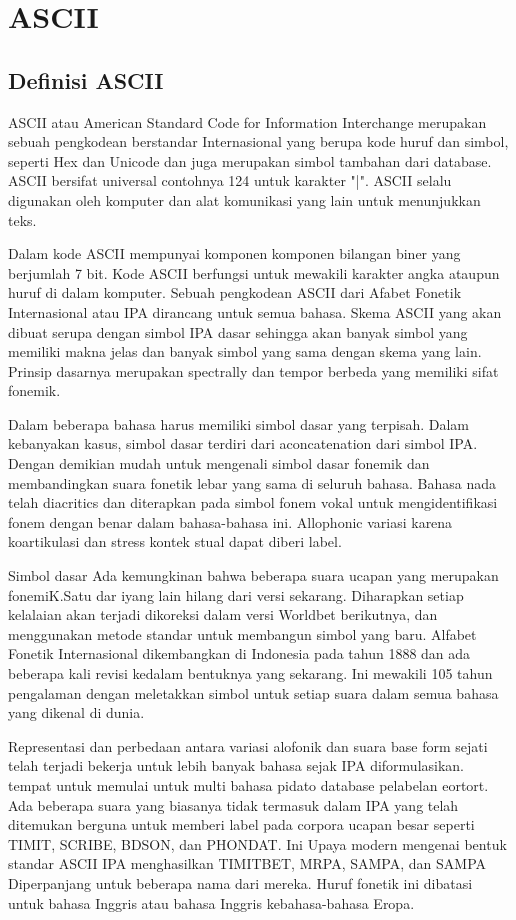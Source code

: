 \section{ASCII}
	\subsection{Definisi ASCII}
	ASCII atau American Standard Code for Information Interchange merupakan sebuah pengkodean berstandar Internasional yang berupa kode huruf dan simbol, seperti Hex dan Unicode dan juga merupakan simbol tambahan dari database. ASCII bersifat universal contohnya 124 untuk karakter "|". ASCII selalu digunakan oleh komputer dan alat komunikasi yang lain untuk menunjukkan teks.
   
    Dalam kode ASCII mempunyai komponen komponen bilangan biner yang berjumlah 7 bit. Kode ASCII berfungsi untuk mewakili karakter angka ataupun huruf di dalam komputer. Sebuah pengkodean ASCII dari Afabet Fonetik Internasional atau IPA dirancang untuk semua bahasa. Skema ASCII yang akan dibuat serupa dengan simbol IPA dasar sehingga akan banyak simbol yang memiliki makna jelas dan banyak simbol yang sama dengan skema yang lain. Prinsip dasarnya merupakan spectrally dan tempor berbeda yang memiliki sifat fonemik.


    Dalam beberapa bahasa harus memiliki simbol dasar yang terpisah. Dalam kebanyakan kasus, simbol dasar terdiri dari aconcatenation dari simbol IPA. Dengan demikian mudah untuk mengenali simbol dasar fonemik
	dan membandingkan suara fonetik lebar yang sama di seluruh bahasa. Bahasa nada telah diacritics dan diterapkan pada simbol fonem vokal untuk mengidentifikasi fonem dengan benar dalam bahasa-bahasa ini. Allophonic variasi karena koartikulasi dan stress kontek stual dapat diberi label.
	

	Simbol dasar Ada kemungkinan bahwa beberapa suara ucapan yang merupakan fonemiK.Satu dar iyang lain hilang dari versi sekarang. Diharapkan setiap kelalaian akan terjadi dikoreksi dalam versi Worldbet berikutnya, dan menggunakan metode standar untuk membangun simbol yang baru. Alfabet Fonetik Internasional dikembangkan di Indonesia pada tahun 1888 dan ada beberapa kali revisi kedalam bentuknya yang sekarang. Ini mewakili 105 tahun pengalaman dengan meletakkan simbol untuk setiap suara dalam semua bahasa yang dikenal di dunia. 


	Representasi dan perbedaan antara variasi alofonik dan suara base form sejati telah terjadi
	bekerja untuk lebih banyak bahasa sejak IPA diformulasikan. 
	tempat untuk memulai untuk multi bahasa pidato database pelabelan eortort.
	Ada beberapa suara yang biasanya tidak termasuk dalam IPA yang telah ditemukan
	berguna untuk memberi label pada corpora ucapan besar seperti TIMIT, SCRIBE, BDSON, dan PHONDAT. Ini
	Upaya modern mengenai bentuk standar ASCII IPA menghasilkan TIMITBET, MRPA, SAMPA, dan
	SAMPA Diperpanjang untuk beberapa nama dari mereka. Huruf fonetik ini dibatasi untuk bahasa Inggris atau bahasa Inggris kebahasa-bahasa Eropa.
